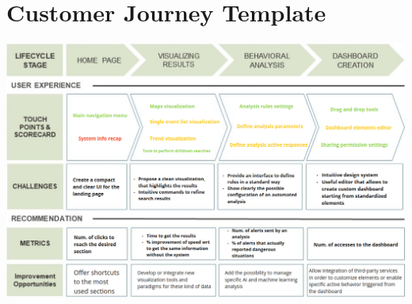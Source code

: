 \documentclass[../main.tex]{subfiles}
\begin{document}
    \section{Customer Journey Template}\label{sec:customer-journey-template}
    \includegraphics[scale = 0.4]{assets/customer_journey.png}
\end{document}
